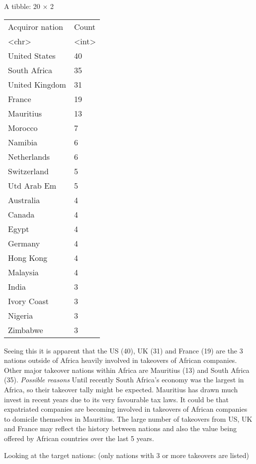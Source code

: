 \documentclass[11pt]{article}
\begin{document}
    A tibble: 20 × 2
\begin{tabular}{ll}
 Acquiror nation & Count\\
 <chr> & <int>\\
\hline
	 United States  & 40\\
	 South Africa   & 35\\
	 United Kingdom & 31\\
	 France         & 19\\
	 Mauritius      & 13\\
	 Morocco        &  7\\
	 Namibia        &  6\\
	 Netherlands    &  6\\
	 Switzerland    &  5\\
	 Utd Arab Em    &  5\\
	 Australia      &  4\\
	 Canada         &  4\\
	 Egypt          &  4\\
	 Germany        &  4\\
	 Hong Kong      &  4\\
	 Malaysia       &  4\\
	 India          &  3\\
	 Ivory Coast    &  3\\
	 Nigeria        &  3\\
	 Zimbabwe       &  3\\
\end{tabular}


    
    Seeing this it is apparent that the US (40), UK (31) and France (19) are
the 3 nations outside of Africa heavily involved in takeovers of African
companies. Other major takeover nations within Africa are Mauritius (13)
and South Africa (35). \emph{Possible reasons} Until recently South
Africa's economy was the largest in Africa, so their takeover tally
might be expected. Mauritius has drawn much invest in recent years due
to its very favourable tax laws. It could be that expatriated companies
are becoming involved in takeovers of African companies to domicile
themselves in Mauritius. The large number of takeovers from US, UK and
France may reflect the history between nations and also the value being
offered by African countries over the last 5 years.

Looking at the target nations: (only nations with 3 or more takeovers
are listed)
\end{document}

